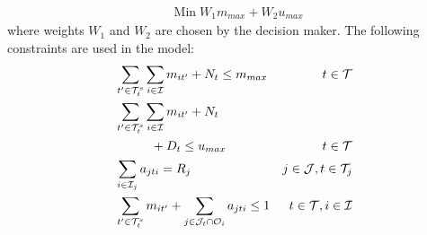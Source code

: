 \documentclass[a4paper,twocolumn,fleqn]{article}
\begin{document}
    \begin{align}
        & \text{Min}\; W_1 m_{max} + W_2 u_{max}
    \end{align}
    where weights $W_1$ and $W_2$ are chosen by the decision maker. 
    The following constraints are used in the model:       
    \begin{align}
        & \sum_{t' \in \mathcal{T}^{s}_t} \sum_{i \in \mathcal{I}} m_{it'} + N_t \leq m_{max}
          & t \in \mathcal{T} \label{eq:capacity1}\\
       & \sum_{t' \in \mathcal{T}^{s}_t} \sum_{i \in \mathcal{I}} m_{it'} + N_t \notag \\
           &\hspace*{10mm}+ D_t\leq u_{max} 
        &t \in \mathcal{T} \label{eq:avalaibility1}\\
        & \sum_{i \in \mathcal{I}_j} a_{jti} = R_j
                & j \in \mathcal{J}, t \in \mathcal{T}_j  \label{eq:taskres}\\
        & \sum_{t' \in \mathcal{T}^{s}_t} m_{it'} + \sum_{j \in \mathcal{J}_t \cap \mathcal{O}_i} a_{jti} \leq 1 
                & t \in \mathcal{T}, i \in \mathcal{I} \label{eq:state}
    \end{align}
\end{document}
